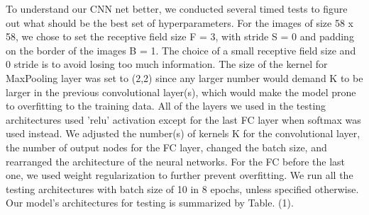 \documentclass{article}
\begin{document}
To understand our CNN net better, we conducted several timed tests to
figure out what should be the best set of hyperparameters. For the
images of size 58 x 58, we chose to set the receptive field size F =
3, with stride S = 0 and padding on the border of the images B =
1. The choice of a small receptive field size and 0 stride is to avoid
losing too much information. The size of the kernel for MaxPooling
layer was set to (2,2) since any larger number would demand K to be
larger in the previous convolutional layer(s), which would make the
model prone to overfitting to the training data. All of the layers we
used in the testing architectures used 'relu' activation except for
the last FC layer when softmax was used instead. We adjusted the
number(s) of kernels K for the convolutional layer, the number of
output nodes for the FC layer, changed the batch size, and rearranged
the architecture of the neural networks. For the FC before the last
one, we used weight regularization to further prevent overfitting. We run all the testing
architectures with batch size of 10 in 8 epochs, unless specified
otherwise. Our model's architectures for testing is summarized by
Table. (1). 
\end{document}
